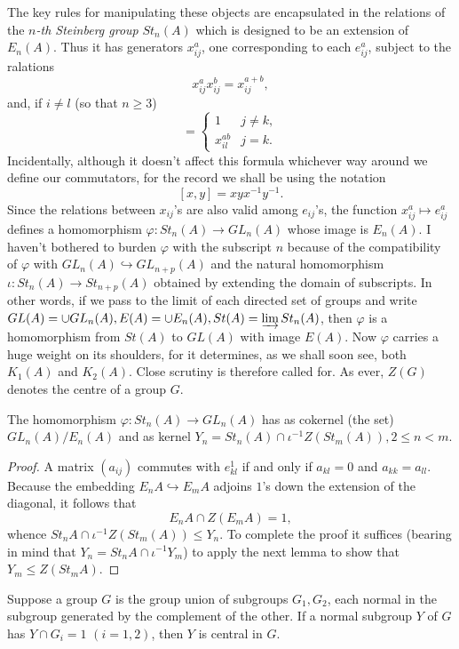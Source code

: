 The key rules for manipulating these objects are encapsulated in the relations of the {\em $n$-th Steinberg group} $St_n(A)$ which is designed to be an extension of $E_n(A)$. Thus it has generators $x_{ij}^a$, one corresponding to each $e_{ij}^a$, subject to the ralations
\[x_{ij}^a x_{ij}^b=x_{ij}^{a+b},\]
and, if $i\neq l$ (so that $n\geqslant 3$)
\begin{equation*}
	[x_{ij}^a,x_{kj}^b]=\left\{
	\begin{array}{cc}
	1 & j\neq k,\\
	x_{il}^{ab} & j=k.
	\end{array}
	\right.
\end{equation*}
Incidentally, although it doesn't affect this formula whichever way around we define our commutators, for the record we shall be using the notation
\[[x,y]=xyx^{-1}y^{-1}.\]
Since the relations between $x_{ij}$'s are also valid among $e_{ij}$'s, the function $x_{ij}^a \mapsto e_{ij}^a$ defines a homomorphism $\varphi:St_n(A)\rightarrow GL_n(A)$ whose image is $E_n(A)$. I haven't bothered to burden $\varphi$ with the subscript $n$ because of the compatibility of $\varphi$ with $GL_n(A)\hookrightarrow GL_{n+p}(A)$ and the natural homomorphism $\iota:St_n(A)\rightarrow St_{n+p}(A)$ obtained by extending the domain of subscripts. In other words, if we pass to the limit of each directed set of groups and write $GL(A)=\cup GL_n(A), E(A)=\cup E_n(A), St(A)=\varinjlim St_n(A)$, then $\varphi$ is a homomorphism from $St(A)$ to $GL(A)$ with image $E(A)$. Now $\varphi$ carries a huge weight on its shoulders, for it determines, as we shall soon see, both $K_1(A)$ and $K_2(A)$. Close scrutiny is therefore called for. As ever, $Z(G)$ denotes the centre of a group $G$.
\begin{lemma}
The homomorphism $\varphi:St_n(A)\rightarrow GL_n(A)$ has as cokernel (the set) $GL_n(A)/E_n(A)$ and as kernel $Y_n=St_n(A)\cap \iota^{-1}Z(St_m(A)), 2\leqslant n < m.$
\end{lemma}
\begin{proof}
A matrix $(a_{ij})$ commutes with $e_{kl}^1$ if and only if $a_{kl}=0$ and $a_{kk}=a_{ll}$. Because the embedding $E_nA\hookrightarrow E_mA$ adjoins $1$'s down the extension of the diagonal, it follows that
\[E_nA\cap Z(E_mA)=1,\]
whence
$St_nA\cap \iota^{-1}Z(St_m(A))\leqslant Y_n.$
To complete the proof it suffices (bearing in mind that $Y_n=St_nA\cap \iota^{-1}Y_m$) to apply the next lemma to show that $Y_m\leqslant Z(St_mA)$.
\end{proof}
\begin{lemma}
Suppose a group $G$ is the group union of subgroups $G_1,G_2$, each normal in the subgroup generated by the complement of the other. If a normal subgroup $Y$ of $G$ has
$Y\cap G_i=1$ $(i=1,2)$, then $Y$ is central in $G$.

\end{lemma}
